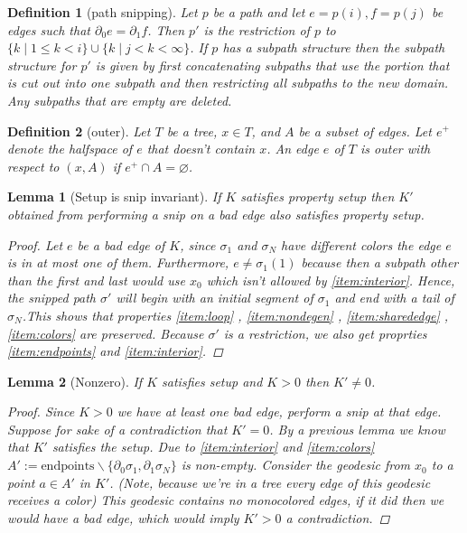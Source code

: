 \documentclass{article}
\theoremstyle{mystyle}
\newtheorem{lem}{Lemma}[section]
\newtheorem{defn}{Definition}
\theoremstyle{remark}
\begin{document}
\begin{defn}
	[path snipping]
	Let \(p\) be a path and let \(e=p(i), f=p(j)\) be edges such that \(\partial_{0}  e = \partial_{1} f \). Then \(p'\) is the restriction of \(p\) to \(\{k\mid 1 \leq k < i\} \cup \{k \mid j < k < \infty\}\). If \(p\) has a subpath structure then the subpath structure for \(p'\) is given by first concatenating subpaths that use the portion that is cut out into one subpath and then restricting all subpaths to the new domain. Any subpaths that are empty are deleted.
	
\end{defn}
\begin{defn}
	[outer]
	Let \(T\) be a tree, \(x \in T\), and \(A\) be a subset of edges. Let \(e^{+}\) denote the halfspace of \(e\) that doesn't contain \(x\). An edge \(e\) of \(T\) is {\em outer} with respect to \((x,A)\) if \(e^{+} \cap A=\varnothing\).  
\end{defn}

\begin{lem}
    [Setup is snip invariant]
 \label{lem:preservesetup} 
    If \(K\) satisfies property setup then \(K'\) obtained from performing a snip on a bad edge also satisfies property setup.
    \begin{proof}
        Let \(e\) be a bad edge of \(K\), since \(\sigma_{1}\) and \(\sigma_{N}\) have different colors the edge \(e\) is in at most one of them. Furthermore, \(e \neq \sigma_{1} (1)\) because then a subpath other than the first and last would use \(x_{0}\) which isn't allowed by \ref{item:interior}. Hence, the snipped path \(\sigma '\) will begin with an initial segment of \(\sigma_{1}\) and end with a tail of \(\sigma_{N}\).This shows that properties \ref{item:loop} , \ref{item:nondegen} , \ref{item:sharededge} , \ref{item:colors} are preserved. Because \(\sigma '\) is a restriction, we also get proprties  \ref{item:endpoints} and \ref{item:interior}. 
    \end{proof}
\end{lem}

\begin{lem}
    [Nonzero]
    \label{lem:nonzero} 
    If \(K\) satisfies setup and \(K > 0\) then \(K' \neq 0\).
    \begin{proof}
        Since \(K > 0\) we have at least one bad edge, perform a snip at that edge. Suppose for sake of a contradiction that \(K' = 0\). By a previous lemma we know that \(K'\) satisfies the setup. Due to \ref{item:interior} and \ref{item:colors} \(A':= \text{endpoints} \smallsetminus \{\partial_{0} \sigma_{1} , \partial_{1} \sigma_{N}\} \) is non-empty. Consider the geodesic from \(x_{0}\) to a point \(a \in A'\) in \(K'\). (Note, because we're in a tree every edge of this geodesic receives a color) This geodesic contains no monocolored edges, if it did then we would have a bad edge, which would imply \(K' > 0\) a contradiction.
    \end{proof}
\end{lem}
\end{document}
